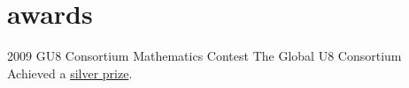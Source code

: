 \documentclass[]{friggeri-cv}  %
\begin{document}

\section{awards}

\begin{entrylist}

    \entry
    {2009}
    {GU8 Consortium Mathematics Contest}
    {The Global U8 Consortium}
    {Achieved a \href{http://db.tt/7b5BuXmT}{silver prize}.}

\end{entrylist}
\end{document}
